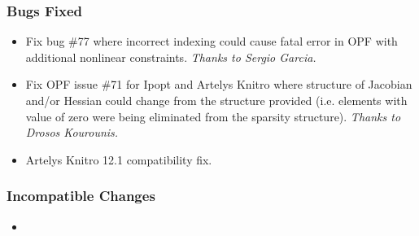 \documentclass[12pt]{article}
\newcommand{\ipopt}[0]{{\sc Ipopt}}
\newcommand{\knitro}[0]{{Artelys Knitro}}
\numberwithin{equation}{section}
\numberwithin{table}{section}
\numberwithin{figure}{section}
\begin{document}
\begin{appendices}
\subsubsection*{Bugs Fixed}
\begin{itemize}
\item Fix bug \#77 where incorrect indexing could cause fatal error
in OPF with additional nonlinear constraints. \emph{Thanks to Sergio Garcia.}
\item Fix OPF issue \#71 for \ipopt{} and \knitro{} where structure of
Jacobian and/or Hessian could change from the structure provided
(i.e. elements with value of zero were being eliminated from the
sparsity structure). \emph{Thanks to Drosos Kourounis.}
\item Artelys Knitro 12.1 compatibility fix.
\end{itemize}

\subsubsection*{Incompatible Changes}
\begin{itemize}
\item 
\end{itemize}


\end{appendices}
\end{document}
